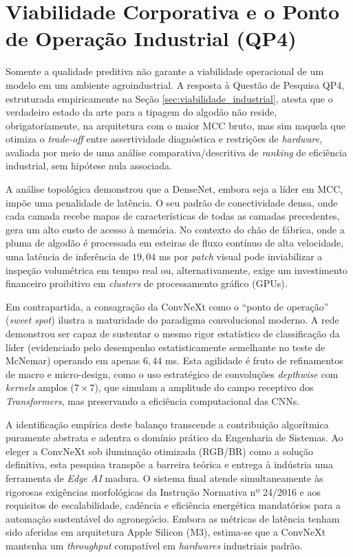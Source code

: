 \section{Viabilidade Corporativa e o Ponto de Operação Industrial (QP4)}
\label{sec:viabilidade_corporativa}

Somente a qualidade preditiva não garante a viabilidade operacional de um modelo em um ambiente agroindustrial. A resposta à Questão de Pesquisa QP4, estruturada empiricamente na Seção \ref{sec:viabilidade_industrial}, atesta que o verdadeiro estado da arte para a tipagem do algodão não reside, obrigatoriamente, na arquitetura com o maior MCC bruto, mas sim naquela que otimiza o \textit{trade-off} entre assertividade diagnóstica e restrições de \textit{hardware}, avaliada por meio de uma análise comparativa/descritiva de \textit{ranking} de eficiência industrial, sem hipótese nula associada.

A análise topológica demonstrou que a DenseNet, embora seja a líder em MCC, impõe uma penalidade de latência. O seu padrão de conectividade densa, onde cada camada recebe mapas de características de todas as camadas precedentes, gera um alto custo de acesso à memória. No contexto do chão de fábrica, onde a pluma de algodão é processada em esteiras de fluxo contínuo de alta velocidade, uma latência de inferência de $19,04$ ms por \textit{patch} visual pode inviabilizar a inspeção volumétrica em tempo real ou, alternativamente, exige um investimento financeiro proibitivo em \textit{clusters} de processamento gráfico (GPUs).

Em contrapartida, a consagração da ConvNeXt como o ``ponto de operação'' (\textit{sweet spot}) ilustra a maturidade do paradigma convolucional moderno. A rede demonstrou ser capaz de sustentar o mesmo rigor estatístico de classificação da líder (evidenciado pelo desempenho estatisticamente semelhante no teste de McNemar) operando em apenas $6,44$ ms. Esta agilidade é fruto de refinamentos de macro e micro-design, como o uso estratégico de convoluções \textit{depthwise} com \textit{kernels} amplos ($7 \times 7$), que simulam a amplitude do campo receptivo dos \textit{Transformers}, mas preservando a eficiência computacional das CNNs.

A identificação empírica deste balanço transcende a contribuição algorítmica puramente abstrata e adentra o domínio prático da Engenharia de Sistemas. Ao eleger a ConvNeXt sob iluminação otimizada (RGB/BR) como a solução definitiva, esta pesquisa transpõe a barreira teórica e entrega à indústria uma ferramenta de \textit{Edge AI} madura. O sistema final atende simultaneamente às rigorosas exigências morfológicas da Instrução Normativa nº 24/2016 e aos requisitos de escalabilidade, cadência e eficiência energética mandatórios para a automação sustentável do agronegócio. Embora as métricas de latência tenham sido aferidas em arquitetura Apple Silicon (M3), estima-se que a ConvNeXt mantenha um \textit{throughput} compatível em \textit{hardwares} industriais padrão.